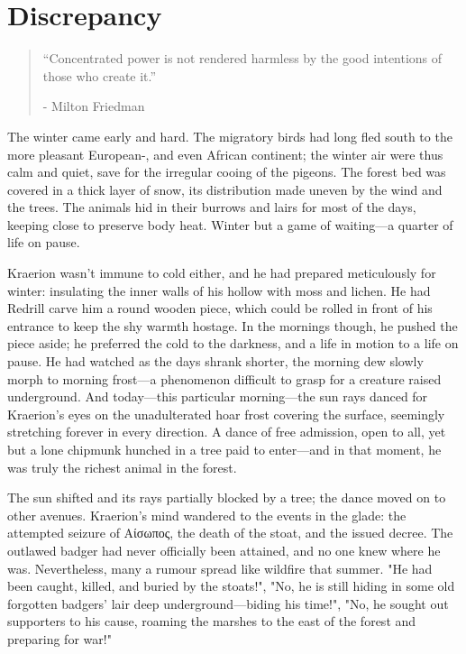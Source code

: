 \chapter{Discrepancy}

\vspace{-1.3cm}
\begin{localsize}{10}
	\begin{quote}
	“Concentrated power is not rendered harmless by the good intentions of those who create it.” 
		\begin{flushright}- Milton Friedman \end{flushright}
	\end{quote} 
\end{localsize}
\vspace{1cm}

The winter came early and hard. The migratory birds had long fled south to the more pleasant European-, and even African continent; the winter air were thus calm and quiet, save for the irregular cooing of the pigeons. The forest bed was covered in a thick layer of snow, its distribution made uneven by the wind and the trees. The animals hid in their burrows and lairs for most of the days, keeping close to preserve body heat. Winter but a game of waiting---a quarter of life on pause.

Kraerion wasn't immune to cold either, and he had prepared meticulously for winter: insulating the inner walls of his hollow with moss and lichen. He had Redrill carve him a round wooden piece, which could be rolled in front of his entrance to keep the shy warmth hostage. In the mornings though, he pushed the piece aside; he preferred the cold to the darkness, and a life in motion to a life on pause. He had watched as the days shrank shorter, the morning dew slowly morph to morning frost---a phenomenon difficult to grasp for a creature raised underground. And today---this particular morning---the sun rays danced for Kraerion's eyes on the unadulterated hoar frost covering the surface, seemingly stretching forever  in every direction. A dance of free admission, open to all, yet but a lone chipmunk hunched in a tree paid to enter---and in that moment, he was truly the richest animal in the forest.

The sun shifted and its rays partially blocked by a tree; the dance moved on to other avenues. Kraerion's mind wandered to the events in the glade: the attempted seizure of Αίσωπος, the death of the stoat, and the issued decree. The outlawed badger had never officially been attained, and no one knew where he was. Nevertheless, many a rumour spread like wildfire that summer. "He had been caught, killed, and buried by the stoats!", "No, he is still hiding in some old forgotten badgers' lair deep underground---biding his time!", "No, he sought out supporters to his cause, roaming the marshes to the east of the forest and preparing for war!" 